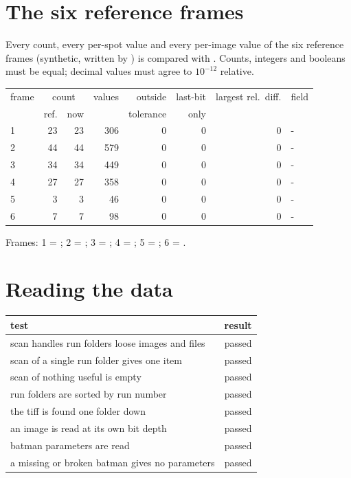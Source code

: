 \documentclass[10pt,a4paper]{article}
\begin{document}
\section{The six reference frames}
Every count, every per-spot value and every per-image value of the six reference frames (synthetic, written by ) is compared with . Counts, integers and booleans must be equal; decimal values must agree to $10^{-12}$ relative.
\begin{center}
\begin{tabular}{lrrrrrrl}
\toprule
frame & \multicolumn{2}{c}{count} & values & outside & last-bit & largest rel.\ diff. & field \\
 & ref. & now & & tolerance & only & & \\
\midrule
1 & 23 & 23 & 306 & 0 & 0 & 0 & - \\
2 & 44 & 44 & 579 & 0 & 0 & 0 & - \\
3 & 34 & 34 & 449 & 0 & 0 & 0 & - \\
4 & 27 & 27 & 358 & 0 & 0 & 0 & - \\
5 & 3 & 3 & 46 & 0 & 0 & 0 & - \\
6 & 7 & 7 & 98 & 0 & 0 & 0 & - \\
\bottomrule
\end{tabular}
\end{center}
{\small Frames: 1 = ; 2 = ; 3 = ; 4 = ; 5 = ; 6 = .}


\section{Reading the data}
\begin{longtable}{@{}p{}r@{}}
\toprule
test & result \\
\midrule
\endhead
scan handles run folders loose images and files & passed \\
scan of a single run folder gives one item & passed \\
scan of nothing useful is empty & passed \\
run folders are sorted by run number & passed \\
the tiff is found one folder down & passed \\
an image is read at its own bit depth & passed \\
batman parameters are read & passed \\
a missing or broken batman gives no parameters & passed \\
\bottomrule
\end{longtable}
\end{document}
